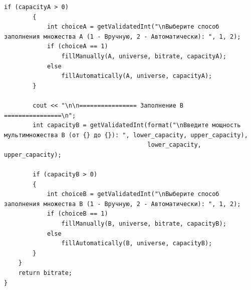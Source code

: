 \documentclass[14pt, a4paper]{extarticle}
\begin{document}
\begin{enumerate}[label=\arabic*., resume]
\begin{lstlisting}[caption={Функция createMultiSets()}, label={lst:func_create_multisets}]
        if (capacityA > 0)
        {
            int choiceA = getValidatedInt("\nВыберите способ заполнения множества A (1 - Вручную, 2 - Автоматически): ", 1, 2);
            if (choiceA == 1)
                fillManually(A, universe, bitrate, capacityA);
            else
                fillAutomatically(A, universe, capacityA);
        }

        cout << "\n\n================ Заполнение B ================\n";
        int capacityB = getValidatedInt(format("\nВведите мощность мультимножества B (от {} до {}): ", lower_capacity, upper_capacity),
                                        lower_capacity, upper_capacity);

        if (capacityB > 0)
        {
            int choiceB = getValidatedInt("\nВыберите способ заполнения множества B (1 - Вручную, 2 - Автоматически): ", 1, 2);
            if (choiceB == 1)
                fillManually(B, universe, bitrate, capacityB);
            else
                fillAutomatically(B, universe, capacityB);
        }
    }
    return bitrate;
}
		\end{lstlisting}
	\end{enumerate}
	
\end{document}

